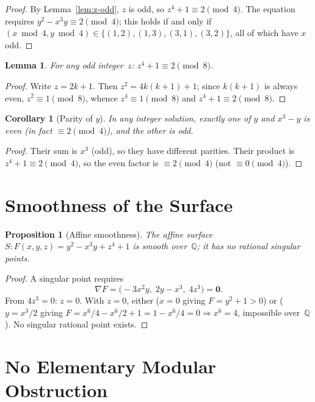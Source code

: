 \documentclass[12pt,a4paper]{article}
\newtheorem{lemma}[theorem]{Lemma}
\newtheorem{corollary}[theorem]{Corollary}
\newtheorem{proposition}[theorem]{Proposition}
\theoremstyle{remark}
\begin{document}
\begin{proof}
By Lemma~\ref{lem:z-odd}, $z$ is odd, so $z^4+1\equiv 2\pmod{4}$.
The equation requires $y^2-x^3y\equiv 2\pmod{4}$; this holds if and only if
$(x\bmod 4,y\bmod 4)\in\{(1,2),(1,3),(3,1),(3,2)\}$,
all of which have $x$ odd.
\end{proof}

\begin{lemma}\label{lem:z4-mod8}
For any odd integer~$z$: $z^4+1\equiv 2\pmod{8}$.
\end{lemma}

\begin{proof}
Write $z=2k+1$.  Then $z^2=4k(k+1)+1$; since $k(k+1)$ is always even,
$z^2\equiv 1\pmod{8}$, whence $z^4\equiv 1\pmod{8}$ and $z^4+1\equiv 2\pmod{8}$.
\end{proof}

\begin{corollary}[Parity of $y$]\label{cor:y-parity}
In any integer solution, exactly one of $y$ and $x^3-y$ is even
(in fact $\equiv 2\pmod{4}$), and the other is odd.
\end{corollary}

\begin{proof}
Their sum is $x^3$ (odd), so they have different parities.
Their product is $z^4+1\equiv 2\pmod{4}$,
so the even factor is $\equiv 2\pmod{4}$ (not $\equiv 0\pmod{4}$).
\end{proof}

\section{Smoothness of the Surface}

\begin{proposition}[Affine smoothness]\label{prop:smooth}
The affine surface $S: F(x,y,z)=y^2-x^3y+z^4+1$ is smooth over~$\mathbb{Q}$;
it has no rational singular points.
\end{proposition}

\begin{proof}
A singular point requires
\[
  \nabla F = \bigl(-3x^2y,\; 2y-x^3,\; 4z^3\bigr) = \mathbf{0}.
\]
From $4z^3=0$: $z=0$.  With $z=0$, either ($x=0$ giving $F=y^2+1>0$) or
($y=x^3/2$ giving $F=x^6/4-x^6/2+1=1-x^6/4=0\Rightarrow x^6=4$, impossible
over~$\mathbb{Q}$). No singular rational point exists.
\end{proof}

\section{No Elementary Modular Obstruction}
\end{document}
